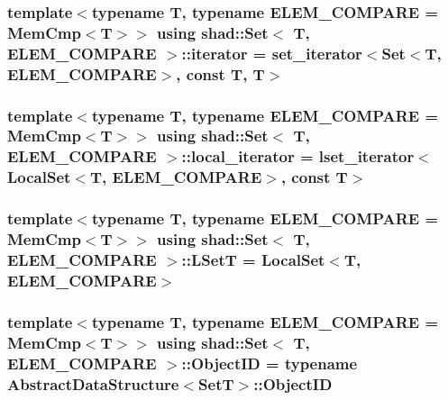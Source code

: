 \hypertarget{classshad_1_1Set_a01298773ecde90c0df1e444429bf9703}{
\subsubsection[{iterator}]{\setlength{\rightskip}{0pt plus 5cm}template$<$typename T, typename E\-L\-E\-M\-\_\-\-C\-O\-M\-P\-A\-R\-E = Mem\-Cmp$<$\-T$>$$>$ using {\bf shad\-::\-Set}$<$ T, E\-L\-E\-M\-\_\-\-C\-O\-M\-P\-A\-R\-E $>$\-::{\bf iterator} =  {\bf set\-\_\-iterator}$<${\bf Set}$<$T, E\-L\-E\-M\-\_\-\-C\-O\-M\-P\-A\-R\-E$>$, const T, T$>$}}\label{classshad_1_1Set_a01298773ecde90c0df1e444429bf9703}
\hypertarget{classshad_1_1Set_a531920d32511b8fa5ffef94b0d772e29}{
\subsubsection[{local\-\_\-iterator}]{\setlength{\rightskip}{0pt plus 5cm}template$<$typename T, typename E\-L\-E\-M\-\_\-\-C\-O\-M\-P\-A\-R\-E = Mem\-Cmp$<$\-T$>$$>$ using {\bf shad\-::\-Set}$<$ T, E\-L\-E\-M\-\_\-\-C\-O\-M\-P\-A\-R\-E $>$\-::{\bf local\-\_\-iterator} =  {\bf lset\-\_\-iterator}$<${\bf Local\-Set}$<$T, E\-L\-E\-M\-\_\-\-C\-O\-M\-P\-A\-R\-E$>$, const T$>$}}\label{classshad_1_1Set_a531920d32511b8fa5ffef94b0d772e29}
\hypertarget{classshad_1_1Set_a93ad50cc28bbc3b48f87e69bfbf3c632}{
\subsubsection[{L\-Set\-T}]{\setlength{\rightskip}{0pt plus 5cm}template$<$typename T, typename E\-L\-E\-M\-\_\-\-C\-O\-M\-P\-A\-R\-E = Mem\-Cmp$<$\-T$>$$>$ using {\bf shad\-::\-Set}$<$ T, E\-L\-E\-M\-\_\-\-C\-O\-M\-P\-A\-R\-E $>$\-::{\bf L\-Set\-T} =  {\bf Local\-Set}$<$T, E\-L\-E\-M\-\_\-\-C\-O\-M\-P\-A\-R\-E$>$}}\label{classshad_1_1Set_a93ad50cc28bbc3b48f87e69bfbf3c632}
\hypertarget{classshad_1_1Set_a05ba25e24c892602d707b21e3e4300b9}{
\subsubsection[{Object\-I\-D}]{\setlength{\rightskip}{0pt plus 5cm}template$<$typename T, typename E\-L\-E\-M\-\_\-\-C\-O\-M\-P\-A\-R\-E = Mem\-Cmp$<$\-T$>$$>$ using {\bf shad\-::\-Set}$<$ T, E\-L\-E\-M\-\_\-\-C\-O\-M\-P\-A\-R\-E $>$\-::{\bf Object\-I\-D} =  typename {\bf Abstract\-Data\-Structure}$<${\bf Set\-T}$>$\-::{\bf Object\-I\-D}}}\label{classshad_1_1Set_a05ba25e24c892602d707b21e3e4300b9}
